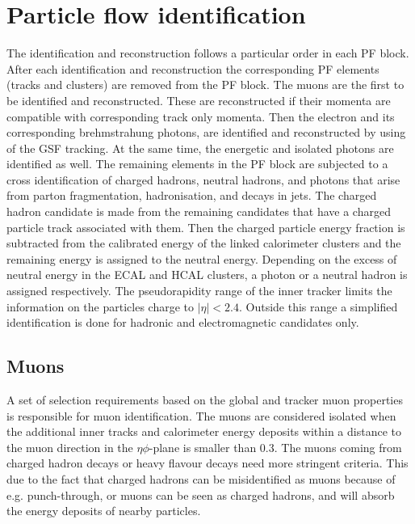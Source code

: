 \section{Particle flow identification}
\label{sec:PF}
The identification and reconstruction follows a particular order in each PF block. After each identification and reconstruction the corresponding PF elements (tracks and clusters) are removed from the PF block. The muons are the first to be identified and reconstructed. These are reconstructed if their momenta are compatible with corresponding track only momenta. Then the electron and its corresponding brehmstrahung photons, are identified and reconstructed by using of the GSF tracking. At the same time, the energetic and isolated photons are identified as well. The remaining elements in the PF block are subjected to a cross identification of charged hadrons, neutral hadrons, and photons that arise from parton fragmentation, hadronisation, and decays in jets. The charged hadron candidate is made from the remaining candidates that have a charged particle track associated with them. Then the charged particle energy fraction is subtracted from the calibrated energy of the linked calorimeter clusters and the remaining energy is assigned to the neutral energy. Depending on the excess of neutral energy in the ECAL and HCAL clusters, a photon or a neutral hadron is assigned respectively. The pseudorapidity range of the inner tracker limits the information on the particles charge to $|\eta| < 2.4$. Outside this range a simplified identification is done for hadronic and electromagnetic candidates only. 

\subsection{Muons}
\label{sec:Muon}
A set of selection requirements based on the global and tracker muon properties is responsible for muon identification. The muons are considered isolated when the additional inner tracks and calorimeter energy deposits within a distance to the muon direction in the $\eta\phi$-plane is smaller than 0.3. The muons coming from charged hadron decays or heavy flavour decays need more stringent criteria. This due to the fact that charged hadrons can be misidentified as muons because of e.g. punch-through, or muons can be seen as charged hadrons, and will absorb the energy deposits of nearby particles. 
